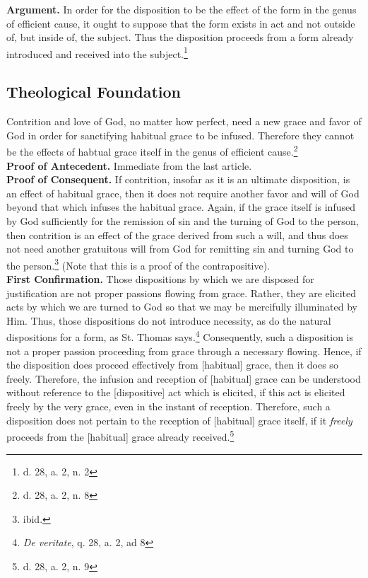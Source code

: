 \documentclass[11pt]{memoir}
\begin{document}
    \noindent \textbf{Argument.} In order for the disposition to be the effect of the form in the genus of efficient cause, it
    ought to suppose that the form exists in act and not outside of, but inside of, the subject. Thus the disposition
    proceeds from a form already introduced and received into the subject.\footnote{d. 28, a. 2, n. 2} 

    \subsection*{Theological Foundation}

    \noindent Contrition and love of God, no matter how perfect, need a new grace and favor of God in order for sanctifying
    habitual grace to be infused. Therefore they cannot be the effects of habtual grace itself in the genus of efficient
    cause.\footnote{d. 28, a. 2, n. 8} \\

    \noindent \textbf{Proof of Antecedent.} Immediate from the last article. \\

    \noindent \textbf{Proof of Consequent.} If contrition, insofar as it is an ultimate disposition, is an effect of
    habitual grace, then it does not require another favor and will of God beyond that which infuses the habitual grace.
    Again, if the grace itself is infused by God sufficiently for the remission
    of sin and the turning of God to the person, then contrition is an effect of the grace derived from such a will, and
    thus does not need another gratuitous will from God for remitting sin and turning God to the person.\footnote{ibid.}
    (Note that this is a proof of the contrapositive). \\

    \noindent \textbf{First Confirmation.} Those dispositions by which we are disposed for justification are not proper
    passions flowing from grace. Rather, they are elicited acts by which we are turned to God so that we may be
    mercifully illuminated by Him. Thus, those dispositions do not introduce necessity, as do the natural dispositions
    for a form, as St. Thomas says.\footnote{\emph{De veritate}, q. 28, a. 2, ad 8} Consequently, such a disposition is
    not a proper passion proceeding from grace through a necessary flowing. Hence, if the disposition does proceed
    effectively from [habitual] grace, then it does so freely. Therefore, the infusion and reception of [habitual] grace can be
    understood without reference to the [dispositive] act which is elicited, if this act is elicited freely by the very
    grace, even in the instant of reception. Therefore, such a disposition does not pertain to the reception of
    [habitual] grace itself, if it \emph{freely} proceeds from the [habitual] grace already 
    received.\footnote{d. 28, a. 2, n. 9} \\
\end{document}
